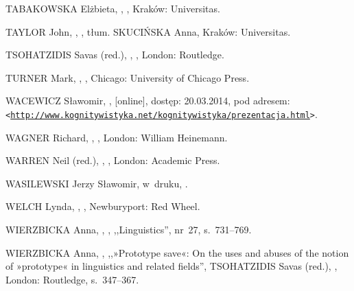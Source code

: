 \documentclass[11pt,a4paper,twoside]{report}
\begin{document}
\begin{thebibliography}{}
{TABAKOWSKA Elżbieta},
,
,
\newblock Kraków: Universitas.

{TAYLOR John},
,
,
\newblock tłum. {SKUCIŃSKA Anna},
\newblock Kraków: Universitas.

{TSOHATZIDIS Savas (red.)},
,
,
\newblock London: Routledge.

{TURNER Mark},
,
,
\newblock Chicago: University of Chicago Press.

{WACEWICZ Sławomir},
,
 [online], dostęp: 20.03.2014, pod adresem:
{\small \texttt{<\url{http://www.kognitywistyka.net/kognitywistyka/prezentacja.html}>}}.

{WAGNER Richard},
,
,
\newblock London: William Heinemann.

{WARREN Neil (red.)},
,
,
\newblock London: Academic Press.

{WASILEWSKI Jerzy Sławomir},
\newblock w~druku,
.

{WELCH Lynda},
,
,
\newblock Newburyport: Red Wheel.

{WIERZBICKA Anna},
,
,
\newblock {[w:]} ,,Linguistics'',
\newblock nr~27, s.~731--769.

{WIERZBICKA Anna},
,
\newblock ,,»Prototype save«: On the uses and abuses of the notion of »prototype« in linguistics and related fields'',
\newblock {[w:]} {TSOHATZIDIS Savas (red.)},
,
\newblock London: Routledge, \linebreak
\newblock s.~347--367.


\end{thebibliography}
\end{document}
